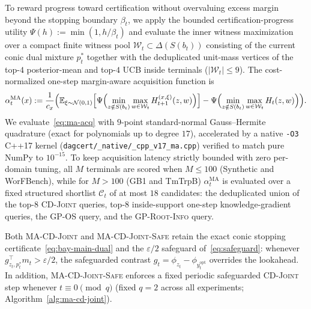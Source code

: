 \documentclass{article}
\theoremstyle{plain}
\theoremstyle{definition}
\begin{document}
To reward progress toward certification without overvaluing excess margin beyond the stopping boundary $\beta_t$, we apply the bounded certification-progress utility $\Psi(h) := \min(1, h / \beta_t)$ and evaluate the inner witness maximization over a compact finite witness pool $\mathcal{W}_t \subset \Delta(S(b_t))$ consisting of the current conic dual mixture $p_t^*$ together with the deduplicated unit-mass vertices of the top-$4$ posterior-mean and top-$4$ UCB inside terminals ($|\mathcal{W}_t| \le 9$). The cost-normalized one-step margin-aware acquisition function is
\begin{equation}
  \alpha_t^{\mathrm{MA}}(x)
  := \frac{1}{c_x}\Bigl(
    \mathbb{E}_{\xi \sim \mathcal{N}(0, 1)}\Bigl[
      \Psi\Bigl(\min_{z \notin S(b_t)} \max_{w \in \mathcal{W}_t} H_{t+1}^{(x,\xi)}(z, w)\Bigr)
    \Bigr]
    - \Psi\Bigl(\min_{z \notin S(b_t)} \max_{w \in \mathcal{W}_t} H_t(z, w)\Bigr)
  \Bigr).
  \label{eq:ma-acq}
\end{equation}
We evaluate~\eqref{eq:ma-acq} with $9$-point standard-normal Gauss--Hermite quadrature (exact for polynomials up to degree $17$), accelerated by a native \texttt{-O3} C++17 kernel (\texttt{dagcert/\_native/\_cpp\_v17\_ma.cpp}) verified to match pure NumPy to $10^{-15}$. To keep acquisition latency strictly bounded with zero per-domain tuning, all $M$ terminals are scored when $M \le 100$ (Synthetic and WorFBench), while for $M > 100$ (GB1 and TmTrpB) $\alpha_t^{\mathrm{MA}}$ is evaluated over a fixed structured shortlist $\mathcal{C}_t$ of at most $18$ candidates: the deduplicated union of the top-$8$ \textsc{CD-Joint} queries, top-$8$ inside-support one-step knowledge-gradient queries, the \textsc{GP-OS} query, and the \textsc{GP-Root-Info} query.

Both \textsc{MA-CD-Joint} and \textsc{MA-CD-Joint-Safe} retain the exact conic stopping certificate~\eqref{eq:bay-main-dual} and the $\varepsilon/2$ safeguard of~\eqref{eq:safeguard}: whenever $g_{z_t, p_t^*}^\top m_t > \varepsilon/2$, the safeguarded contrast $g_t = \phi_{z_t} - \phi_{y_t^{\mathrm{opt}}}$ overrides the lookahead. In addition, \textsc{MA-CD-Joint-Safe} enforces a fixed periodic safeguarded \textsc{CD-Joint} step whenever $t \equiv 0 \pmod{q}$ (fixed $q = 2$ across all experiments; Algorithm~\ref{alg:ma-cd-joint}).
\end{document}
